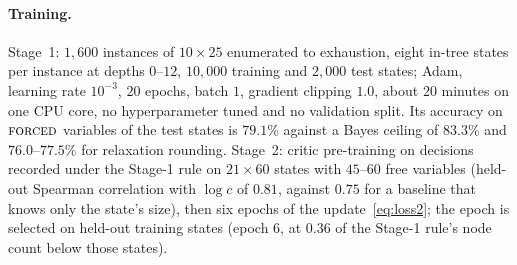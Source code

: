 \documentclass[final,5p,times,twocolumn,authoryear]{elsarticle}
\newcommand{\FORCED}{\textsc{forced}}
\begin{document}


\paragraph{Training.} Stage~1: $1{,}600$ instances of $10\times25$ enumerated to exhaustion, eight in-tree states per instance at depths $0$--$12$, $10{,}000$ training and $2{,}000$ test states; Adam, learning rate $10^{-3}$, $20$ epochs, batch $1$, gradient clipping $1.0$, about $20$ minutes on one CPU core, no hyperparameter tuned and no validation split. Its accuracy on $\FORCED$ variables of the test states is $79.1\%$ against a Bayes ceiling of $83.3\%$ and $76.0$--$77.5\%$ for relaxation rounding. Stage~2: critic pre-training on decisions recorded under the Stage-1 rule on $21\times60$ states with $45$--$60$ free variables (held-out Spearman correlation with $\log c$ of $0.81$, against $0.75$ for a baseline that knows only the state's size), then six epochs of the update~\eqref{eq:loss2}; the epoch is selected on held-out training states (epoch $6$, at $0.36$ of the Stage-1 rule's node count below those states).
\end{document}
